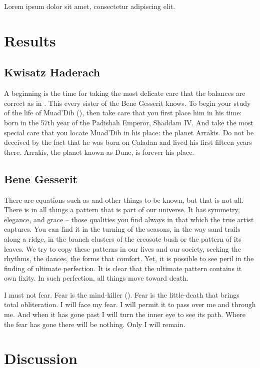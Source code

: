 
Lorem ipsum dolor sit amet, consectetur adipiscing elit\cite{OKeeNade78a}. \lipsum[2-3]

\section*{Results}

\subsection*{Kwisatz Haderach}

A beginning is the time for taking the most delicate care that the balances are correct as in . This every
sister of the Bene Gesserit knows.  To begin your study of the life
of Muad'Dib (), then take care that you first place him in his time: born in the 57th year of the
Padishah Emperor, Shaddam IV. And take the most special care that you locate Muad'Dib in his place: the planet Arrakis.
Do not be deceived by the fact that he was born on Caladan and lived his first fifteen years there. Arrakis, the planet
known as Dune, is forever his place.

\subsection*{Bene Gesserit}

There are equations such as  and other things to be known\cite{Hill78a}, but that is not all. There is in
all things a pattern that is part of our universe. It has symmetry, elegance, and grace -- those qualities you find
always in that which the true artist captures. You can find it in the turning of the seasons, in the way sand trails
along a ridge, in the branch clusters of the creosote bush or the pattern of its leaves. We try to copy these patterns
in our lives and our society, seeking the rhythms, the dances, the forms that comfort. Yet, it is possible to see peril
in the finding of ultimate perfection. It is clear that the ultimate pattern contains it own fixity. In such
perfection, all things move toward death.

I must not fear. Fear is the mind-killer (). Fear is the little-death that brings total
obliteration. I will face my fear. I will permit it to pass over me and through me. And when it has gone past I will
turn the inner eye to see its path. Where the fear has gone there will be nothing. Only I will remain. 

\section*{Discussion}

\lipsum[4-6]